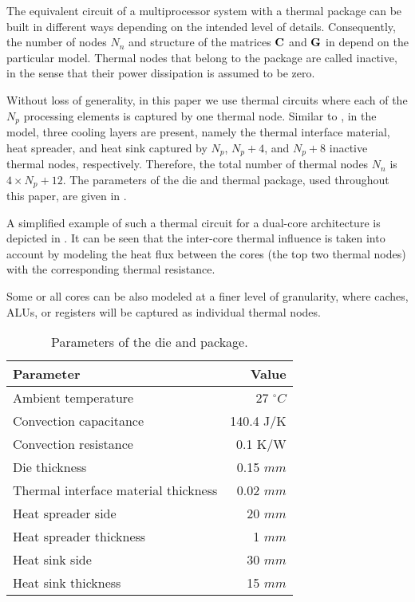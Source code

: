 The equivalent circuit of a multiprocessor system with a thermal package can be
built in different ways depending on the intended level of details.
Consequently, the number of nodes $N_n$ and structure of the matrices $\mathbf{C}$
and $\mathbf{G}$ in  depend on the particular model. Thermal
nodes that belong to the package are called inactive, in the sense that their
power dissipation is assumed to be zero.

Without loss of generality, in this paper we use thermal circuits where each of
the $N_p$ processing elements is captured by one thermal node. Similar to
\cite{skadron2003}, in the model, three cooling layers are present, namely the
thermal interface material, heat spreader, and heat sink captured by $N_p$, $N_p
+ 4$, and $N_p + 8$ inactive thermal nodes, respectively. Therefore, the total
number of thermal nodes $N_n$ is $4 \times N_p + 12$. The parameters of the die
and thermal package, used throughout this paper, are given in .

A simplified example of such a thermal circuit for a dual-core architecture is
depicted in . It can be seen that the inter-core thermal influence
is taken into account by modeling the heat flux between the cores (the top two
thermal nodes) with the corresponding thermal resistance.

Some or all cores can be also modeled at a finer level of granularity, where
caches, ALUs, or registers will be captured as individual thermal nodes.

\begin{table}[b]
  \vspace{15pt}
  \caption{Parameters of the die and package.}
  \centering
  \begin{tabular}{|l|r|}
    \hline
    Parameter & Value \\
    \hline
    \hline
    Ambient temperature                   &   27 ${}^\circ C$ \\
    Convection capacitance                & 140.4 J/K \\
    Convection resistance                 & 0.1 K/W \\
    Die thickness                         & 0.15 $mm$ \\
    Thermal interface material thickness  & 0.02 $mm$ \\
    Heat spreader side                    &   20 $mm$ \\
    Heat spreader thickness               &    1 $mm$ \\
    Heat sink side                        &   30 $mm$ \\
    Heat sink thickness                   &   15 $mm$ \\
    \hline
  \end{tabular}
\end{table}

